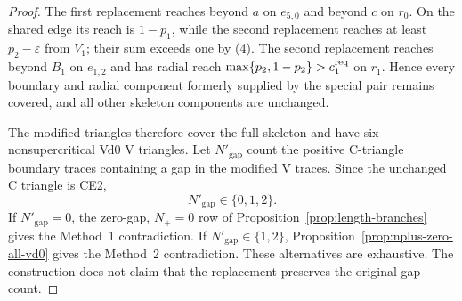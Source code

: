 \begin{proof}
The first replacement reaches beyond $a$ on $e_{5,0}$ and beyond $c$ on
$r_0$. On the shared edge its reach is $1-p_1$, while the second replacement
reaches at least $p_2-\varepsilon$ from $V_1$; their sum exceeds one by (4).
The second replacement reaches beyond $B_1$ on $e_{1,2}$ and has radial
reach $\max\{p_2,1-p_2\}>c_1^{\rm req}$ on $r_1$. Hence every boundary and
radial component formerly supplied by the special pair remains covered, and
all other skeleton components are unchanged.

The modified triangles therefore cover the full skeleton and have six
nonsupercritical Vd0 V triangles.  Let $N'_{\mathrm{gap}}$ count the positive
C-triangle boundary traces containing a gap in the modified V traces.  Since
the unchanged C triangle is CE2,
\[
 N'_{\mathrm{gap}}\in\{0,1,2\}.
\]
If $N'_{\mathrm{gap}}=0$, the zero-gap, $N_+=0$ row of
Proposition~\ref{prop:length-branches} gives the Method~1 contradiction.  If
$N'_{\mathrm{gap}}\in\{1,2\}$,
Proposition~\ref{prop:nplus-zero-all-vd0} gives the Method~2 contradiction.
These alternatives are exhaustive.  The construction does not claim that
the replacement preserves the original gap count.
\end{proof}

